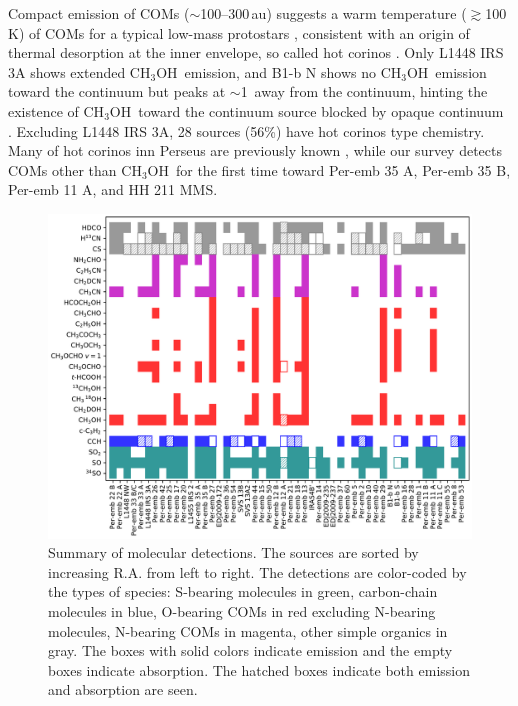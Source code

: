 \documentclass[twocolumn]{aastex62}
\newcommand{\methanol}{\mbox{CH$_{3}$OH}}
\begin{document}
Compact emission of COMs ($\sim$100--300\,au) suggests a warm temperature ($\gtrsim$100\,K) of COMs for a typical low-mass protostars \citep[e.g. ][]{2017ApJ...835..259Y}, consistent with an origin of thermal desorption at the inner envelope, so called hot corinos \citep{2004ASPC..323..195C}.  Only L1448 IRS 3A shows extended \methanol\ emission, and B1-b N shows no \methanol\ emission toward the continuum but peaks at $\sim$1\arcsec\ away from the continuum, hinting the existence of \methanol\ toward the continuum source blocked by opaque continuum \citep{2018AA...620A..80M}.  Excluding L1448 IRS 3A, 28 sources (56\%) have hot corinos type chemistry.  Many of hot corinos inn Perseus are previously known \citep[e.g., ][]{2004ApJ...615..354B,2007AA...463..601B,2018AA...620A..80M,2019MNRAS.483.1850B}, while our survey detects COMs other than \methanol\ for the first time toward Per-emb 35 A, Per-emb 35 B, Per-emb 11 A, and HH 211 MMS.

\begin{figure}[htbp!]
  \includegraphics[width=\textwidth]{stats.pdf}
  \caption{Summary of molecular detections.  The sources are sorted by increasing R.A. from left to right.  The detections are color-coded by the types of species: S-bearing molecules in green, carbon-chain molecules in blue, O-bearing COMs in red excluding N-bearing molecules, N-bearing COMs in magenta, other simple organics in gray.  The boxes with solid colors indicate emission and the empty boxes indicate absorption.  The hatched boxes indicate both emission and absorption are seen.}
  \label{fig:stats}
\end{figure}
\end{document}

